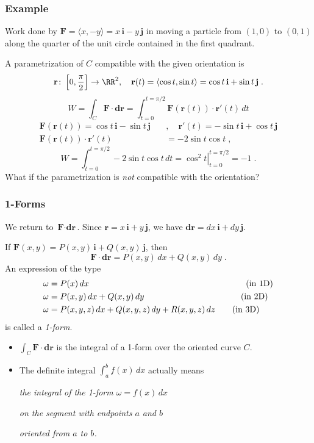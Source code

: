 \begin{frame}
  \frametitle{Example}

  Work done by $\textbf{F}= \langle x, -y \rangle = x \, \textbf{i} - y\, \textbf{j}$ in moving a particle from $(1,0)$ to $(0,1)$ along the quarter of the unit circle contained in the first quadrant.\pause

A parametrization of $C$ compatible with the given orientation is
%
$$ \textbf{r}\colon \left[0, \frac{\pi}{2}\right]\to \RR^2, \quad \textbf{r}(t) = \langle \cos{t}, \sin{t} \rangle = \cos{t} \, \textbf{i} + \sin{t} \, \textbf{j}\; .$$
%
\pause
%
$$W = \int_C \textbf{F} \cdot \textbf{dr} = \int_{t=0}^{t=\pi/2} \textbf{F}(\textbf{r}(t)) \cdot \textbf{r}'(t) \, dt$$
%
\begin{align*}
  \textbf{F}(\textbf{r}(t)) = \cos{t}\, \textbf{i} -\sin{t}\, \textbf{j} \quad & , \quad
  \textbf{r}'(t)  = -\sin{t}\, \textbf{i} + \cos{t}\, \textbf{j} \\
  \textbf{F}(\textbf{r}(t)) \cdot \textbf{r}'(t) & = -2\sin{t}\cos{t} \; ,
\end{align*}
%
\pause
%
$$W = \int_{t=0}^{t=\pi/2} -2\sin{t}\cos{t}\, dt = \left. \cos^2{t} \right|_{t=0}^{t=\pi/2} = -1\; . $$
%
\pause What if the parametrization is \emph{not} compatible with the orientation?
\end{frame}


\begin{frame}
  \frametitle{1-Forms}

  We return to $\textbf{F} \cdot \textbf{dr}$.
Since $\textbf{r} =x\, \textbf{i} + y\, \textbf{j}$, we have $\textbf{dr} =dx\, \textbf{i} + dy\, \textbf{j}$.

If $\textbf{F}(x,y) = P(x,y) \, \textbf{i} + Q(x,y)\, \textbf{j}$, then
%
$$\textbf{F} \cdot \textbf{dr} = P(x,y) \, dx + Q(x,y) \, dy\; .$$
%
\pause An expression of the type
%
\begin{align*}
  \omega & = P(x) \, dx \hspace{6.5cm} \text{(in 1D)}\\
  \omega & = P(x,y) \, dx + Q(x,y) \, dy \hspace{4cm} \text{(in 2D)}\\
  \omega & = P(x,y,z) \, dx + Q(x,y,z) \, dy+ R(x,y,z)\, dz \qquad \text{(in 3D)}
\end{align*}
%
is called a \emph{1-form}.
\begin{itemize}
  \item \pause $\int_C \textbf{F} \cdot \textbf{dr}$ is the integral of a 1-form over the oriented curve $C$.

  \item \pause The definite integral $\int_a^b f(x) \,dx$ actually means

  \pause \emph{the integral of the 1-form $\omega = f(x) \, dx$} \pause

  \emph{on the segment with endpoints $a$ and $b$} \pause

  \emph{oriented from $a$ to $b$.}
\end{itemize}
\end{frame}

